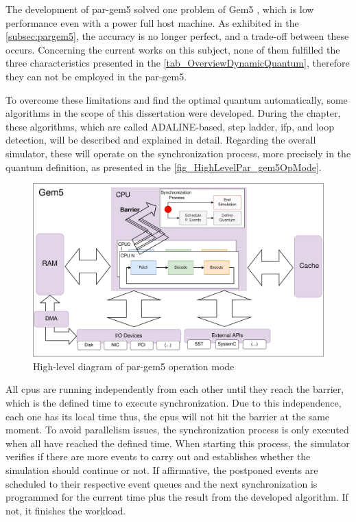 
The development of par-gem5 \cite{pargem5} solved one problem of Gem5 \cite{TheGem5Simulator}, which is low performance even with a power 
full host machine. As exhibited in the \autoref{subsec:pargem5}, the accuracy is no longer perfect, and a trade-off between these occurs. 
Concerning the current works on this subject, none of them fulfilled the three characteristics presented in the 
\autoref{tab_OverviewDynamicQuantum}, therefore they can not be employed in the par-gem5. 

To overcome these limitations and find the optimal quantum automatically, some algorithms in the scope of this dissertation were developed.  
During the chapter, these algorithms, which are called ADALINE-based, step ladder, \gls{ifp}, and loop detection, will be described 
and explained in detail. Regarding the overall simulator, these will operate on the synchronization process, more precisely in the quantum definition, 
as presented in the \autoref{fig_HighLevelPar_gem5OpMode}. 

\begin{figure}[]
	\centering
 	\includegraphics[width=0.8\linewidth]{Images/HighLevelPar_gem5OpMode.png}
 	\caption{High-level diagram of par-gem5 operation mode}
	 \label{fig_HighLevelPar_gem5OpMode}
\end{figure}


All \glspl{cpu} are running independently from each other until they reach the barrier, which is the defined time to execute 
synchronization. Due to this independence, each one has its local time thus, the \glspl{cpu} will not hit the barrier at the same moment. 
To avoid parallelism issues, the synchronization process is only executed when all have reached the defined time. When starting this 
process, the simulator verifies if there are more events to carry out and establishes whether the simulation should continue or not.
If affirmative, the postponed events are scheduled to their respective event queues and the next synchronization is programmed for 
the current time plus the result from the developed algorithm. If not, it finishes the workload.

